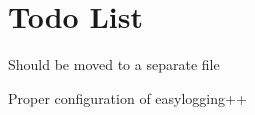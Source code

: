 \chapter{Todo List}
\hypertarget{todo}{}\label{todo}

\begin{DoxyRefList}
\item[Member \doxylink{namespaceWIP_a11d0d8373a8a6c4eebcc8b0d2dcccac9}{WIP\+::setup\+Easy\+Logging} ()]\label{todo__todo000001}%
%

\begin{DoxyItemize}
\item Should be moved to a separate file
\item Proper configuration of easylogging++ 
\end{DoxyItemize}
\end{DoxyRefList}